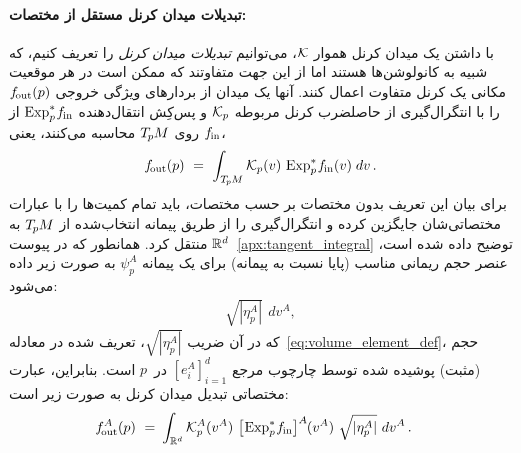 \paragraph{تبدیلات میدان کرنل مستقل از مختصات:}
با داشتن یک میدان کرنل هموار $\mathcal{K}$، می‌توانیم \emph{تبدیلات میدان کرنل} را تعریف کنیم، که شبیه به کانولوشن‌ها هستند اما از این جهت متفاوتند که ممکن است در هر موقعیت مکانی یک کرنل متفاوت اعمال کنند.
آنها یک میدان از بردارهای ویژگی خروجی $f_\textup{\:\!\!out}(p)$ را با
انتگرال‌گیری از حاصلضرب کرنل مربوطه $\mathcal{K}_p$ و پس‌کِش انتقال‌دهنده $\operatorname{Exp}^*_p\mkern-2mu f_\textup{\;\!\!in}$ از $f_\textup{\;\!\!in}$ روی $T_{\mkern-1.5mu p}\mkern-.5muM$ محاسبه می‌کنند، یعنی،
\begin{align}\label{eq:kft_coord_free}
	\fout(p)\ =\ 
	\int_{\TpM}
	\Kp(v) \,
	\Expspfin(v) \;
	dv \,.
\end{align}
برای بیان این تعریف بدون مختصات بر حسب مختصات، باید تمام کمیت‌ها را با عبارات مختصاتی‌شان جایگزین کرده و انتگرال‌گیری را از طریق پیمانه انتخاب‌شده از $T_{\mkern-1.5mu p}\mkern-.5muM$ به $\mathbb{R}^d$ منتقل کرد.
همانطور که در پیوست~\ref{apx:tangent_integral} توضیح داده شده است، عنصر حجم ریمانی مناسب (پایا نسبت به پیمانه) برای یک پیمانه $\psi_p^A$ به صورت زیر داده می‌شود:
\begin{align}
	\sqrt{|\eta_p^A|} \,\ dv^A ,
\end{align}
که در آن ضریب $\sqrt{|\eta_p^A|}$، تعریف شده در معادله~\eqref{eq:volume_element_def}، حجم (مثبت) پوشیده شده توسط چارچوب مرجع $[e_i^A]_{i=1}^d$ در~$p$ است.
بنابراین، عبارت مختصاتی تبدیل میدان کرنل به صورت زیر است:
\begin{align}\label{eq:kft_coord_expression}
	\fout^A(p)
	\ =&\ 
	\int_{\R^d}
	\Kp^A(v^A) \ 
	\big[\mkern-2mu \Expspfin\big]^A \mkern-1mu(v^A) \ 
	\sqrt{|\eta_p^A|}\ dv^A
	\,.
\end{align}

